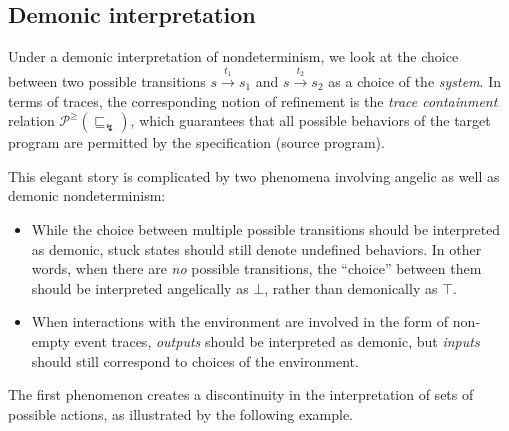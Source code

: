 \documentclass[11pt,oneside]{book}
\theoremstyle{definition}
\newcommand{\refby}{\sqsubseteq} %
\begin{document}

\subsection{Demonic interpretation} %

Under a demonic interpretation of nondeterminism,
we look at the choice between two possible transitions
$s \stackrel{t_1}{\longrightarrow} s_1$ and
$s \stackrel{t_2}{\longrightarrow} s_2$
as a choice of the \emph{system}.
In terms of traces,
the corresponding notion of refinement
is the \emph{trace containment} relation
$\mathcal{P}^\ge({\refby_\lightning})$,
which guarantees that all possible behaviors of the target program
are permitted by the specification (source program).

This elegant story is complicated by two phenomena
involving angelic as well as demonic nondeterminism:
\begin{itemize}
  \item
    While the choice between multiple possible transitions
    should be interpreted as demonic,
    stuck states should still denote undefined behaviors.
    In other words,
    when there are \emph{no} possible transitions,
    the ``choice'' between them should be interpreted
    angelically as $\bot$,
    rather than demonically as $\top$.
  \item
    When interactions with the environment are involved
    in the form of non-empty event traces,
    \emph{outputs} should be interpreted as demonic,
    but \emph{inputs} should still correspond to
    choices of the environment.
\end{itemize}
The first phenomenon creates a discontinuity
in the interpretation of sets of possible actions,
as illustrated by the following example.
\end{document}
